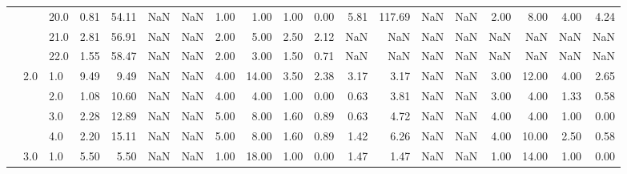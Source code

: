\begin{tabular}{lllrrrrrrrrrrrrrrrr}
       &     & 20.0 &      0.81 &      54.11 &               NaN &                NaN &  1.00 &   1.00 &             1.00 &                         0.00 &      5.81 &     117.69 &               NaN &                NaN & 2.00 &   8.00 &             4.00 &                         4.24 \\
       &     & 21.0 &      2.81 &      56.91 &               NaN &                NaN &  2.00 &   5.00 &             2.50 &                         2.12 &       NaN &        NaN &               NaN &                NaN &  NaN &    NaN &              NaN &                          NaN \\
       &     & 22.0 &      1.55 &      58.47 &               NaN &                NaN &  2.00 &   3.00 &             1.50 &                         0.71 &       NaN &        NaN &               NaN &                NaN &  NaN &    NaN &              NaN &                          NaN \\
       & 2.0 & 1.0  &      9.49 &       9.49 &               NaN &                NaN &  4.00 &  14.00 &             3.50 &                         2.38 &      3.17 &       3.17 &               NaN &                NaN & 3.00 &  12.00 &             4.00 &                         2.65 \\
       &     & 2.0  &      1.08 &      10.60 &               NaN &                NaN &  4.00 &   4.00 &             1.00 &                         0.00 &      0.63 &       3.81 &               NaN &                NaN & 3.00 &   4.00 &             1.33 &                         0.58 \\
       &     & 3.0  &      2.28 &      12.89 &               NaN &                NaN &  5.00 &   8.00 &             1.60 &                         0.89 &      0.63 &       4.72 &               NaN &                NaN & 4.00 &   4.00 &             1.00 &                         0.00 \\
       &     & 4.0  &      2.20 &      15.11 &               NaN &                NaN &  5.00 &   8.00 &             1.60 &                         0.89 &      1.42 &       6.26 &               NaN &                NaN & 4.00 &  10.00 &             2.50 &                         0.58 \\
       & 3.0 & 1.0  &      5.50 &       5.50 &               NaN &                NaN &  1.00 &  18.00 &             1.00 &                         0.00 &      1.47 &       1.47 &               NaN &                NaN & 1.00 &  14.00 &             1.00 &                         0.00 \\

\end{tabular}
